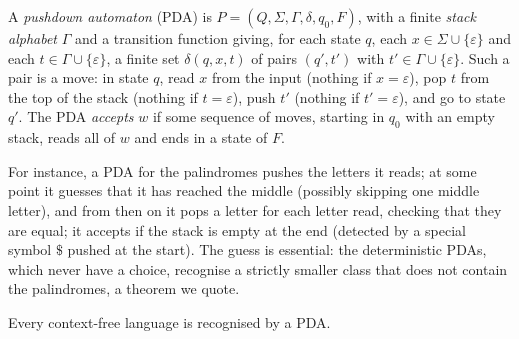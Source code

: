 \begin{definition}\label{def:pda}
A \emph{pushdown automaton} (PDA) is $P=(Q,\Sigma,\Gamma,\delta,q_0,F)$, with a finite \emph{stack alphabet} $\Gamma$ and a transition function giving, for each state $q$, each $x\in\Sigma\cup\{\varepsilon\}$ and each $t\in\Gamma\cup\{\varepsilon\}$, a finite set $\delta(q,x,t)$ of pairs $(q',t')$ with $t'\in\Gamma\cup\{\varepsilon\}$. Such a pair is a move: in state $q$, read $x$ from the input (nothing if $x=\varepsilon$), pop $t$ from the top of the stack (nothing if $t=\varepsilon$), push $t'$ (nothing if $t'=\varepsilon$), and go to state $q'$. The PDA \emph{accepts} $w$ if some sequence of moves, starting in $q_0$ with an empty stack, reads all of $w$ and ends in a state of $F$.
\end{definition}

For instance, a PDA for the palindromes pushes the letters it reads; at some point it guesses that it has reached the middle (possibly skipping one middle letter), and from then on it pops a letter for each letter read, checking that they are equal; it accepts if the stack is empty at the end (detected by a special symbol $\$$ pushed at the start). The guess is essential: the deterministic PDAs, which never have a choice, recognise a strictly smaller class that does not contain the palindromes, a theorem we quote.

\begin{theorem}\label{thm:cfgtopda}
Every context-free language is recognised by a PDA.
\end{theorem}

